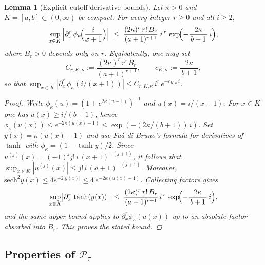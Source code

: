 \documentclass[11pt,a4paper]{amsart}
\theoremstyle{plain}
\newtheorem{lemma}[theorem]{Lemma}
\theoremstyle{definition}
\theoremstyle{remark}
\begin{document}
\begin{lemma}[Explicit cutoff-derivative bounds]\label{lem:cutoff-derivatives}
Let $\kappa>0$ and $K=[a,b]\subset(0,\infty)$ be compact. For every integer $r\ge 0$ and all $i\ge 2$,
\[
\sup_{x\in K}\,\Bigl|\partial_x^r\,\phi_{\kappa}\!\Bigl(\frac{i}{x+1}\Bigr)\Bigr|
\ \le\ \frac{(2\kappa)^r\,r!\,B_r}{(a+1)^{r+1}}\; i^{\,r}\, \exp\!\Bigl(-\frac{2\kappa}{\,b+1\,}\, i\Bigr),
\]
where $B_r>0$ depends only on $r$. Equivalently, one may set
\[
C_{r,K,\kappa}:=\frac{(2\kappa)^r\,r!\,B_r}{(a+1)^{r+1}},\qquad c_{K,\kappa}:=\frac{2\kappa}{\,b+1\,},
\]
so that $\sup_{x\in K}|\partial_x^r\,\phi_{\kappa}(i/(x+1))|\le C_{r,K,\kappa}\, i^{r}\, e^{-c_{K,\kappa}\, i}$.
\begin{proof}
Write $\phi_\kappa(u)=(1+e^{2\kappa(u-1)})^{-1}$ and $u(x)=i/(x+1)$. For $x\in K$ one has $u(x)\ge i/(b+1)$, hence $\phi_\kappa(u(x))\le e^{-2\kappa(u(x)-1)}\le \exp(-(2\kappa/(b+1))\,i)$. Set $y(x)=\kappa(u(x)-1)$ and use Faà di Bruno’s formula for derivatives of $\tanh$ with $\phi_\kappa=(1-\tanh y)/2$. Since $u^{(j)}(x)=(-1)^j j!\,i\,(x+1)^{-(j+1)}$, it follows that $\sup_{x\in K}|u^{(j)}(x)|\le j!\,i\,(a+1)^{-(j+1)}$. Moreover, $\mathrm{sech}^2 y(x)\le 4e^{-2|y(x)|}\le 4\,e^{-2\kappa(u(x)-1)}$. Collecting factors gives
\[
\sup_{x\in K}\bigl|\partial_x^r\,\tanh(y(x))\bigr|\ \le\ \frac{(2\kappa)^r\,r!\,B_r}{(a+1)^{r+1}}\,i^{\,r}\,\exp\!\Bigl(-\frac{2\kappa}{\,b+1\,}\,i\Bigr),
\]
and the same upper bound applies to $\partial_x^r\phi_\kappa(u(x))$ up to an absolute factor absorbed into $B_r$. This proves the stated bound.
\end{proof}
\end{lemma}



\subsection{Properties of $\mathcal{P}_{\tau}$}
\end{document}
